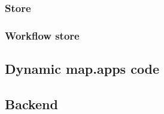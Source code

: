 \subsubsection{Store}

\subsubsection{Workflow store} \label{workflow_store}


\subsection{Dynamic map.apps code}

\subsection{Backend}